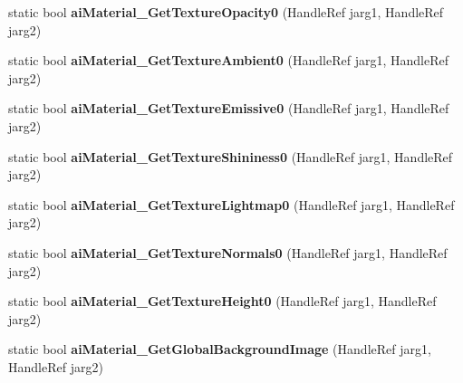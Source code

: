 \begin{DoxyCompactItemize}
\item 
\hypertarget{class_assimp_p_i_n_v_o_k_e_a428cc55f9ec10201ff32698c2bf7506f}{static bool {\bfseries ai\+Material\+\_\+\+Get\+Texture\+Opacity0} (Handle\+Ref jarg1, Handle\+Ref jarg2)}\label{class_assimp_p_i_n_v_o_k_e_a428cc55f9ec10201ff32698c2bf7506f}

\item 
\hypertarget{class_assimp_p_i_n_v_o_k_e_a5eee52247f84ba6b3cfe54d50820a984}{static bool {\bfseries ai\+Material\+\_\+\+Get\+Texture\+Ambient0} (Handle\+Ref jarg1, Handle\+Ref jarg2)}\label{class_assimp_p_i_n_v_o_k_e_a5eee52247f84ba6b3cfe54d50820a984}

\item 
\hypertarget{class_assimp_p_i_n_v_o_k_e_a3d8f201b12cf2e9b28e32b4e9e92ed3a}{static bool {\bfseries ai\+Material\+\_\+\+Get\+Texture\+Emissive0} (Handle\+Ref jarg1, Handle\+Ref jarg2)}\label{class_assimp_p_i_n_v_o_k_e_a3d8f201b12cf2e9b28e32b4e9e92ed3a}

\item 
\hypertarget{class_assimp_p_i_n_v_o_k_e_a773c816dac80a4a8ff68cd7aeb8a799c}{static bool {\bfseries ai\+Material\+\_\+\+Get\+Texture\+Shininess0} (Handle\+Ref jarg1, Handle\+Ref jarg2)}\label{class_assimp_p_i_n_v_o_k_e_a773c816dac80a4a8ff68cd7aeb8a799c}

\item 
\hypertarget{class_assimp_p_i_n_v_o_k_e_a8ae2593b9fca9ceda7996695b72b09ac}{static bool {\bfseries ai\+Material\+\_\+\+Get\+Texture\+Lightmap0} (Handle\+Ref jarg1, Handle\+Ref jarg2)}\label{class_assimp_p_i_n_v_o_k_e_a8ae2593b9fca9ceda7996695b72b09ac}

\item 
\hypertarget{class_assimp_p_i_n_v_o_k_e_a1c60dd69af4e95388d34b12f86f9aae1}{static bool {\bfseries ai\+Material\+\_\+\+Get\+Texture\+Normals0} (Handle\+Ref jarg1, Handle\+Ref jarg2)}\label{class_assimp_p_i_n_v_o_k_e_a1c60dd69af4e95388d34b12f86f9aae1}

\item 
\hypertarget{class_assimp_p_i_n_v_o_k_e_a3d65a2cb88427a4b599b8bdf52982cde}{static bool {\bfseries ai\+Material\+\_\+\+Get\+Texture\+Height0} (Handle\+Ref jarg1, Handle\+Ref jarg2)}\label{class_assimp_p_i_n_v_o_k_e_a3d65a2cb88427a4b599b8bdf52982cde}

\item 
\hypertarget{class_assimp_p_i_n_v_o_k_e_aa33f0a1424f7e4bfb71f06b88e9f443f}{static bool {\bfseries ai\+Material\+\_\+\+Get\+Global\+Background\+Image} (Handle\+Ref jarg1, Handle\+Ref jarg2)}\label{class_assimp_p_i_n_v_o_k_e_aa33f0a1424f7e4bfb71f06b88e9f443f}


\end{DoxyCompactItemize}
